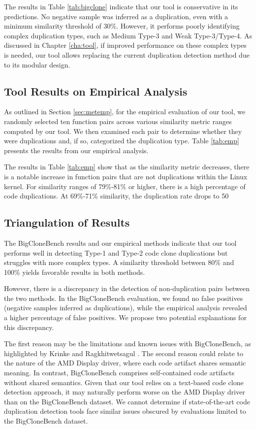 The results in Table \ref{tab:bigclone} indicate that our tool is conservative in its predictions. No negative sample was inferred as a duplication, even with a minimum similarity threshold of 30\%. However, it performs poorly identifying complex duplication types, such as Medium Type-3 and Weak Type-3/Type-4. As discussed in Chapter \ref{cha:tool}, if improved performance on these complex types is needed, our tool allows replacing the current duplication detection method due to its modular design.

\subsection{Tool Results on Empirical Analysis}

As outlined in Section \ref{sec:metemp}, for the empirical evaluation of our tool, we randomly selected ten function pairs across various similarity metric ranges computed by our tool. We then examined each pair to determine whether they were duplications and, if so, categorized the duplication type. Table \ref{tab:emp} presents the results from our empirical analysis.



The results in Table \ref{tab:emp} show that as the similarity metric decreases, there is a notable increase in function pairs that are not duplications within the Linux kernel. For similarity ranges of 79\%-81\% or higher, there is a high percentage of code duplications. At 69\%-71\% similarity, the duplication rate drops to 50%

\subsection{Triangulation of Results}

The BigCloneBench results and our empirical methods indicate that our tool performs well in detecting Type-1 and Type-2 code clone duplications but struggles with more complex types. A similarity threshold between 80\% and 100\% yields favorable results in both methods.

However, there is a discrepancy in the detection of non-duplication pairs between the two methods. In the BigCloneBench evaluation, we found no false positives (negative samples inferred as duplications), while the empirical analysis revealed a higher percentage of false positives. We propose two potential explanations for this discrepancy.

The first reason may be the limitations and known issues with BigCloneBench, as highlighted by Krinke and Ragkhitwetsagul \citep{bigfail}. The second reason could relate to the nature of the AMD Display driver, where each code artifact shares semantic meaning. In contrast, BigCloneBench comprises self-contained code artifacts without shared semantics. Given that our tool relies on a text-based code clone detection approach, it may naturally perform worse on the AMD Display driver than on the BigCloneBench dataset. We cannot determine if state-of-the-art code duplication detection tools face similar issues obscured by evaluations limited to the BigCloneBench dataset.
